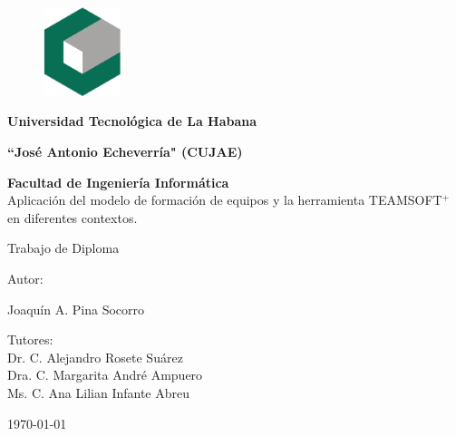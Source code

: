 \begin{figure}
	\centering
	\includegraphics[width=0.2\textwidth]{figuras/cujae.eps}
\end{figure}
\vspace{3cm}	
\begin{center}
	\Large{\textbf{Universidad Tecnológica de La Habana}}
	
	\Large{\textbf{“José Antonio Echeverría" (CUJAE)}}
	
	\Large{\textbf{
			Facultad de Ingeniería Informática}}\\
	
	\vspace{1.3cm}
	\Large{Aplicación del modelo de formación de equipos y la herramienta TEAMSOFT$^+$ en diferentes contextos.}
	\vspace{2cm}
	
	\normalsize
	{\Large		
	Trabajo de Diploma
	}
	\vspace{2cm}
	
	Autor: 
	
	Joaquín A. Pina Socorro
	\vspace{1cm}
	
	Tutores:\\
	Dr. C. Alejandro Rosete Suárez\\
	Dra. C. Margarita André Ampuero\\
	Ms. C. Ana Lilian Infante Abreu
	
	
	\vspace{2cm}
	
	\small{\mifecha\today}
	
\end{center}	


